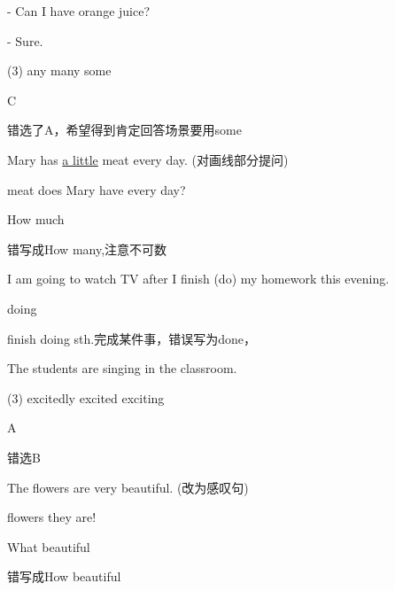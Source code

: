 \begin{question}[tags={xiaoxuect}]
- Can I have \blank[width=1cm]{} orange juice?

\noindent - Sure.

  \begin{tasks}(3)
    \task any
    \task many
    \task some
  \end{tasks}

\end{question}
\begin{solution}
C

错选了A，希望得到肯定回答场景要用some
\end{solution}

\begin{question}[tags={xiaoxuect}]
Mary has \underline{a little} meat every day. (对画线部分提问)

\noindent \blank*[width=2cm]{} \blank*[width=2cm]{} meat does Mary have every day?

\end{question}
\begin{solution}
How much

错写成How many,注意不可数
\end{solution}

\begin{question}[tags={xiaoxuect}]
I am going to watch TV after I finish \blank[width=1.5cm]{}(do) my homework this evening.
\end{question}
\begin{solution}
doing

finish doing sth.完成某件事，错误写为done，
\end{solution}

\begin{question}[tags={xiaoxuect}]
The students are singing \blank[width=1.0cm]{} in the classroom.

  \begin{tasks}(3)
    \task excitedly
    \task excited
    \task exciting
  \end{tasks}
\end{question}
\begin{solution}
A

错选B
\end{solution}

\begin{question}[tags={xiaoxuect}]
The flowers are very beautiful. (改为感叹句)

\noindent \blank*[width=1.9cm]{} \blank*[width=1.9cm]{} flowers they are!
\end{question}
\begin{solution}
What beautiful

错写成How beautiful
\end{solution}

